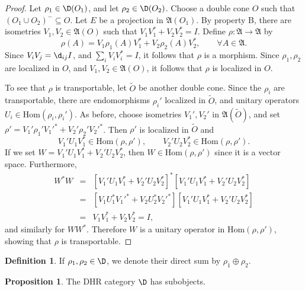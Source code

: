 \documentclass[12pt]{article}
\newcommand{\alg}[1]{\mathfrak{#1}}
\theoremstyle{definition}
\newtheorem{prop}[thm]{Proposition}
\theoremstyle{definition}
\newtheorem{defn}[thm]{Definition}
\theoremstyle{remark}
\newcommand{\Hom}{\mathrm{Hom}}
\begin{document}
\begin{proof} Let $\rho _1\in \D (O_1)$, and let $\rho _2 \in \D (O_2)$.  Choose a
  double cone $O$ such that $(O_1\cup O_2)^{-}\subseteq O$.  Let $E$ be a projection
  in $\alg{A}(O_1)$.  By property B, there are isometries $V_1,V_2\in \alg{A}(O)$
  such that $V_1V_1^*+V_2V_2^*=I$.  Define $\rho :\alg{A}\to \alg{A}$ by
  $$ \rho (A)=V_1 \rho _1(A)V_1^*+V_2\rho _2(A)V_2^* ,\qquad \forall A\in \alg{A} .$$
  Since $V_iV_j=\d _{ij}I$, and $\sum _iV_iV_i^*=I$, it follows that $\rho$ is a
  morphism.  Since $\rho _1,\rho _2$ are localized in $O$, and $V_1,V_2\in
  \alg{A}(O)$, it follows that $\rho$ is localized in $O$.

  To see that $\rho$ is transportable, let $\widetilde{O}$ be another double cone.
  Since the $\rho _i$ are transportable, there are endomorphisms $\rho _i'$ localized
  in $\widetilde{O}$, and unitary operators $U_i\in \Hom (\rho _i,\rho _i')$.  As
  before, choose isometries $V_1',V_2'$ in $\alg{A}(\widetilde{O})$, and set $\rho
  '=V_1'\rho _1'{V_1'}^*+V_2'\rho _2'{V_2'}^*$.  Then $\rho '$ is localized in
  $\widetilde{O}$ and
  \begin{equation*} {V_1'}U_1V_1^* \in \Hom (\rho ,\rho ') ,\qquad {V_2'}U_2V_2^* \in
    \Hom (\rho ,\rho ') . \end{equation*} If we set
  $W={V_1'}U_1V_1^*+{V_2'}U_2V_2^*$, then $W\in \Hom (\rho ,\rho ')$ since it is a
  vector space.  Furthermore,
\begin{eqnarray*} W^*W &=&
  [{V_1'}U_1V_1^*+{V_2'}U_2V_2^*]^*[{V_1'}U_1V_1^*+{V_2'}U_2V_2^*]  \\
  &=&
  [V_1U_1^*{V_1'}^*+V_2U_2^*{V_2'}^*] [{V_1'}U_1V_1^*+{V_2'}U_2V_2^*] \\
  &=& V_1V_1^*+V_2V_2^* = I , \end{eqnarray*} and similarly for $WW^*$.  Therefore
$W$ is a unitary operator in $\Hom (\rho ,\rho ')$, showing that $\rho$ is
transportable.
\end{proof}

\begin{defn} If $\rho _1,\rho _2 \in \D$, we denote their direct sum by $\rho
  _1\oplus \rho _2$. \end{defn}

\begin{prop} The DHR category $\D$ has subobjects.  \end{prop}
\end{document}
